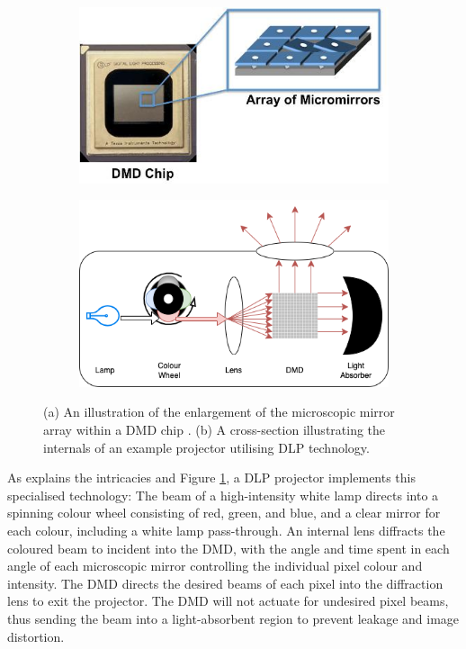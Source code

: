 \begin{figure}[h]
    \centering
    \begin{subfigure}{.4\textwidth}
        \centering
        \includegraphics[width=1\linewidth]{assets/dmd-chip.jpg}
        \caption{}
    \end{subfigure}
    \qquad
    \begin{subfigure}{.4\textwidth}
        \centering
        \includegraphics[width=1\linewidth]{assets/dlp-projector.png}
        \caption{}
    \end{subfigure}
    \caption{(a) An illustration of the enlargement of the microscopic mirror array within a DMD chip \cite{HowDoesDLP}. (b) A cross-section illustrating the internals of an example projector utilising DLP technology.}
    \label{fig:dmd_dlp}
\end{figure}

As \cite{HowDLPProjector} explains the intricacies and Figure \ref{fig:dmd_dlp}, a DLP projector implements this specialised technology: The beam of a high-intensity white lamp directs into a spinning colour wheel consisting of red, green, and blue, and a clear mirror for each colour, including a white lamp pass-through. An internal lens diffracts the coloured beam to incident into the DMD, with the angle and time spent in each angle of each microscopic mirror controlling the individual pixel colour and intensity. The DMD directs the desired beams of each pixel into the diffraction lens to exit the projector. The DMD will not actuate for undesired pixel beams, thus sending the beam into a light-absorbent region to prevent leakage and image distortion.

